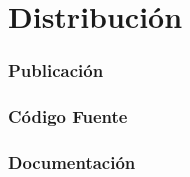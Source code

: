 
\chapter{Distribución}

\subsection{Publicación}

\subsection{Código Fuente}

\subsection{Documentación}
